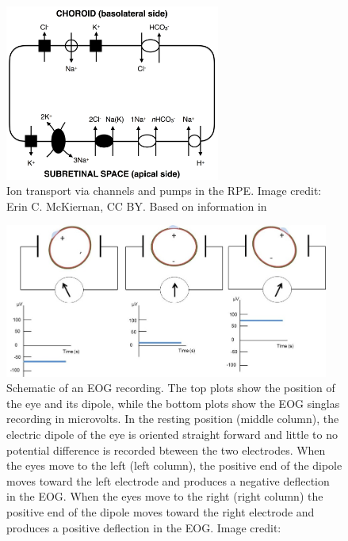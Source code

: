 \documentclass[12pt]{article}
\begin{document}
\begin{figure}[b!]
\centering
\includegraphics[width=0.63\textwidth]{images/rpeTransport.png}
\caption{Ion transport via channels and pumps in the RPE. Image credit: Erin C. McKiernan, CC BY. Based on information in \cite{joseph1991apical,quinn1992ion}}
\label{fig:crp}
\end{figure}

\begin{figure}[h!]
\centering
\includegraphics[width=0.95\textwidth]{images/eog.jpeg}
\caption{Schematic of an EOG recording. The top plots show the position of the eye and its dipole, while the bottom plots show the EOG singlas recording in microvolts. In the resting position (middle column), the electric dipole of the eye is oriented straight forward and little to no potential difference is recorded bteween the two electrodes. When the eyes move to the left (left column), the positive end of the dipole moves toward the left electrode and produces a negative deflection in the EOG. When the eyes move to the right (right column) the positive end of the dipole moves toward the right electrode and produces a positive deflection in the EOG. Image credit: \cite{viqueira2013ocular}}
\label{fig:eog}
\end{figure}
\end{document}
